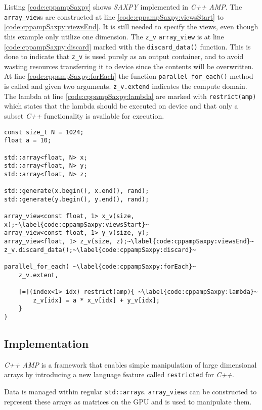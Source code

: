 Listing \ref{code:cppampSaxpy} shows \textit{SAXPY} implemented in \textit{C++ AMP}. The \texttt{array\_view}s are constructed at line \ref{code:cppampSaxpy:viewsStart} to \ref{code:cppampSaxpy:viewsEnd}. It is still needed to specify the views, even though this example only utilize one dimension. The \texttt{z\_v} \texttt{array\_view} is at line \ref{code:cppampSaxpy:discard} marked with the \texttt{discard\_data()} function. This is done to indicate that \texttt{z\_v} is used purely as an output container, and to avoid wasting resources transferring it to device since the contents will be overwritten.
At line \ref{code:cppampSaxpy:forEach} the function \texttt{parallel\_for\_each()} method is called and given two arguments. \texttt{z\_v.extend} indicates the compute domain. The lambda at line \ref{code:cppampSaxpy:lambda} are marked with \texttt{restrict(amp)} which states that the lambda should be executed on device and that only a subset \textit{C++} functionality is available for execution.
\begin{lstlisting}[caption={\textit{SAXPY} computation in \textit{C++ AMP}.}, label={code:cppampSaxpy}]
const size_t N = 1024;
float a = 10;

std::array<float, N> x;
std::array<float, N> y;
std::array<float, N> z;

std::generate(x.begin(), x.end(), rand);
std::generate(y.begin(), y.end(), rand);

array_view<const float, 1> x_v(size, x);~\label{code:cppampSaxpy:viewsStart}~
array_view<const float, 1> y_v(size, y);
array_view<float, 1> z_v(size, z);~\label{code:cppampSaxpy:viewsEnd}~
z_v.discard_data();~\label{code:cppampSaxpy:discard}~

parallel_for_each( ~\label{code:cppampSaxpy:forEach}~
    z_v.extent,

    [=](index<1> idx) restrict(amp){ ~\label{code:cppampSaxpy:lambda}~
        z_v[idx] = a * x_v[idx] + y_v[idx];
    }
)
\end{lstlisting}

\subsection{Implementation}

\textit{C++ AMP} is a framework that enables simple manipulation of large dimensional arrays by introducing a new language feature called \texttt{restricted} for \textit{C++}. 

Data is managed within regular \texttt{std::array}s. \texttt{array\_view}s can be constructed to represent these arrays as matrices on the GPU and is used to manipulate them.


